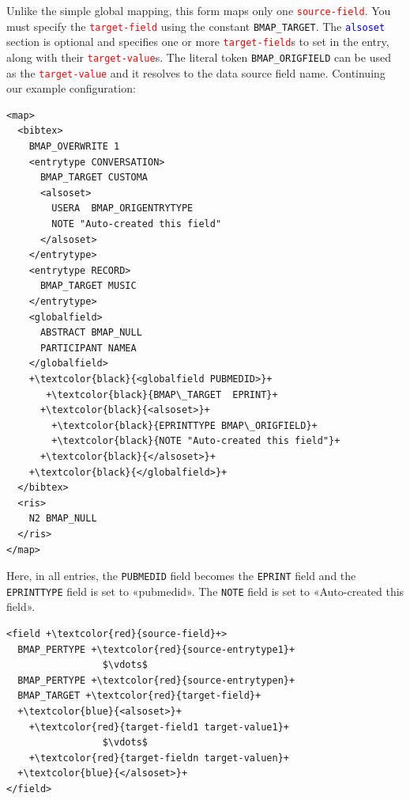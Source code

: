 \documentclass{ltxdockit}
\begin{document}
\noindent Unlike the simple global mapping, this form maps only one
\textcolor{red}{\texttt{source-field}}. You must specify the
\textcolor{red}{\texttt{target-field}} using the constant
\verb+BMAP_TARGET+. The \textcolor{blue}{\texttt{alsoset}} section is
optional and specifies one or more \textcolor{red}{\texttt{target-field}}s
to set in the entry, along with their
\textcolor{red}{\texttt{target-value}}s. The literal token
\verb+BMAP_ORIGFIELD+ can be used as the
\textcolor{red}{\texttt{target-value}} and it resolves to the data source
field name. Continuing our example configuration:

{\color{grey}
\lstset{showspaces=false}
\begin{lstlisting}[escapechar=+,mathescape=true]
<map>
  <bibtex>
    BMAP_OVERWRITE 1
    <entrytype CONVERSATION>
      BMAP_TARGET CUSTOMA
      <alsoset>
        USERA  BMAP_ORIGENTRYTYPE
        NOTE "Auto-created this field"
      </alsoset>
    </entrytype>
    <entrytype RECORD>
      BMAP_TARGET MUSIC
    </entrytype>
    <globalfield>
      ABSTRACT BMAP_NULL
      PARTICIPANT NAMEA
    </globalfield>
    +\textcolor{black}{<globalfield PUBMEDID>}+
       +\textcolor{black}{BMAP\_TARGET  EPRINT}+
      +\textcolor{black}{<alsoset>}+
        +\textcolor{black}{EPRINTTYPE BMAP\_ORIGFIELD}+
        +\textcolor{black}{NOTE "Auto-created this field"}+
      +\textcolor{black}{</alsoset>}+
    +\textcolor{black}{</globalfield>}+
  </bibtex>
  <ris>
    N2 BMAP_NULL
  </ris>
</map>
\end{lstlisting}
}

\noindent Here, in all entries, the \verb+PUBMEDID+ field becomes the
\verb+EPRINT+ field and the \verb+EPRINTTYPE+ field is set to «pubmedid».
The \verb+NOTE+ field is set to «Auto-created this field».
\bigskip
{}

\lstset{showspaces=false}
\begin{lstlisting}[escapechar=+,mathescape=true]
<field +\textcolor{red}{source-field}+>
  BMAP_PERTYPE +\textcolor{red}{source-entrytype1}+
                 $\vdots$
  BMAP_PERTYPE +\textcolor{red}{source-entrytypen}+
  BMAP_TARGET +\textcolor{red}{target-field}+
  +\textcolor{blue}{<alsoset>}+
    +\textcolor{red}{target-field1 target-value1}+
                 $\vdots$
    +\textcolor{red}{target-fieldn target-valuen}+
  +\textcolor{blue}{</alsoset>}+
</field>
\end{lstlisting}
\end{document}
